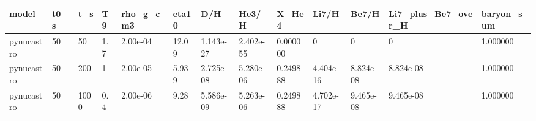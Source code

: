 \begin{tabular}{lllllllllllll}
\toprule
model & t0_s & t_s & T9 & rho_g_cm3 & eta10 & D/H & He3/H & X_He4 & Li7/H & Be7/H & Li7_plus_Be7_over_H & baryon_sum \\
\midrule
pynucastro & 50 & 50 & 1.7 & 2.00e-04 & 12.09 & 1.143e-27 & 2.402e-55 & 0.000000 & 0 & 0 & 0 & 1.000000 \\
pynucastro & 50 & 200 & 1 & 2.00e-05 & 5.939 & 2.725e-08 & 5.280e-06 & 0.249888 & 4.404e-16 & 8.824e-08 & 8.824e-08 & 1.000000 \\
pynucastro & 50 & 1000 & 0.4 & 2.00e-06 & 9.28 & 5.586e-09 & 5.263e-06 & 0.249888 & 4.702e-17 & 9.465e-08 & 9.465e-08 & 1.000000 \\
\bottomrule
\end{tabular}
